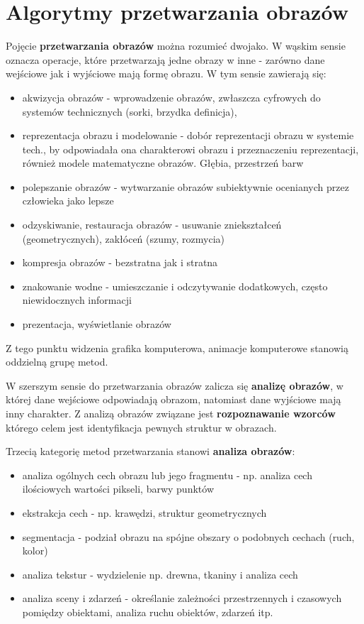 \documentclass[a4paper,twoside]{report}
\begin{document}
\section{Algorytmy przetwarzania obrazów}
Pojęcie \textbf{przetwarzania obrazów} można rozumieć dwojako. W wąskim sensie oznacza operacje, które przetwarzają jedne obrazy w inne - zarówno dane wejściowe jak i wyjściowe mają formę obrazu. W tym sensie zawierają się:
\begin{itemize}
	\item akwizycja obrazów - wprowadzenie obrazów, zwłaszcza cyfrowych do systemów technicznych (sorki, brzydka definicja),
	\item reprezentacja obrazu i modelowanie - dobór reprezentacji obrazu w systemie tech., by odpowiadała ona charakterowi obrazu i przeznaczeniu reprezentacji, również modele matematyczne obrazów. Głębia, przestrzeń barw
	\item polepszanie obrazów - wytwarzanie obrazów subiektywnie ocenianych przez człowieka jako lepsze
	\item odzyskiwanie, restauracja obrazów - usuwanie zniekształceń (geometrycznych), zakłóceń (szumy, rozmycia)
	\item kompresja obrazów - bezstratna jak i stratna
	\item znakowanie wodne - umieszczanie i odczytywanie dodatkowych, często niewidocznych informacji
	\item prezentacja, wyświetlanie obrazów
\end{itemize}
	
	Z tego punktu widzenia grafika komputerowa, animacje komputerowe stanowią oddzielną grupę metod.
	
	W szerszym sensie do przetwarzania obrazów zalicza się \textbf{analizę obrazów}, w której dane wejściowe odpowiadają obrazom, natomiast dane wyjściowe mają inny charakter. Z analizą obrazów związane jest \textbf{rozpoznawanie wzorców} którego celem jest identyfikacja pewnych struktur w obrazach.
	
	Trzecią kategorię metod przetwarzania stanowi \textbf{analiza obrazów}:
\begin{itemize}
	\item analiza ogólnych cech obrazu lub jego fragmentu - np. analiza cech ilościowych wartości pikseli, barwy punktów
	\item ekstrakcja cech - np. krawędzi, struktur geometrycznych
	\item segmentacja - podział obrazu na spójne obszary o podobnych cechach (ruch, kolor)
	\item analiza tekstur - wydzielenie np. drewna, tkaniny i analiza cech
	\item analiza sceny i zdarzeń - określanie zależności przestrzennych i czasowych pomiędzy obiektami, analiza ruchu obiektów, zdarzeń itp.
\end{itemize}
\end{document}

